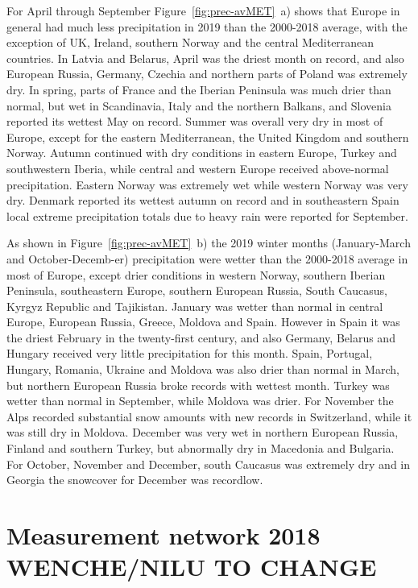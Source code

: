 For April through September  Figure~\ref{fig:prec-avMET}~a) shows that Europe in general had much less precipitation in 2019 than the 2000-2018 average, with the exception of UK, Ireland, southern Norway and the central Mediterranean countries. In Latvia and Belarus, April was the driest month on record, and also European Russia, Germany, Czechia and northern parts of Poland was extremely dry. In spring, parts of France and the Iberian Peninsula was much drier than normal, but wet in Scandinavia, Italy and the northern Balkans, and Slovenia reported its wettest May on record. Summer was overall very dry in most of Europe, except for the eastern Mediterranean, the United Kingdom and southern Norway. Autumn continued with dry conditions in eastern Europe, Turkey and southwestern Iberia, while central and western Europe received above-normal precipitation. Eastern Norway was extremely wet while western Norway was very dry. Denmark reported its wettest autumn on record and in southeastern Spain local extreme precipitation totals due to heavy rain were reported for September.

As shown in Figure~\ref{fig:prec-avMET}~b) the 2019 winter months (January-March and October-Decemb-er) precipitation were wetter than the 2000-2018 average in most of Europe, except drier conditions in western Norway, southern Iberian Peninsula, southeastern Europe, southern European Russia, South Caucasus, Kyrgyz Republic
and Tajikistan. January was wetter than normal in central Europe, European Russia, Greece, Moldova and Spain. However in Spain it was the driest February in the twenty-first century, and also Germany, Belarus and Hungary received very little precipitation for this month. Spain, Portugal, Hungary, Romania, Ukraine and Moldova was also drier than normal in March, but northern European Russia broke records with wettest month. Turkey was wetter than normal in September, while Moldova was drier. For November the Alps recorded substantial snow amounts with new records in Switzerland, while it was still dry in Moldova. December was very wet in northern European Russia, Finland and southern Turkey, but abnormally dry in Macedonia and Bulgaria. For October, November and December, south Caucasus was extremely dry and in Georgia the snowcover for December was recordlow.
\section{Measurement network 2018 WENCHE/NILU TO CHANGE} 
\label{Obs_2018}

